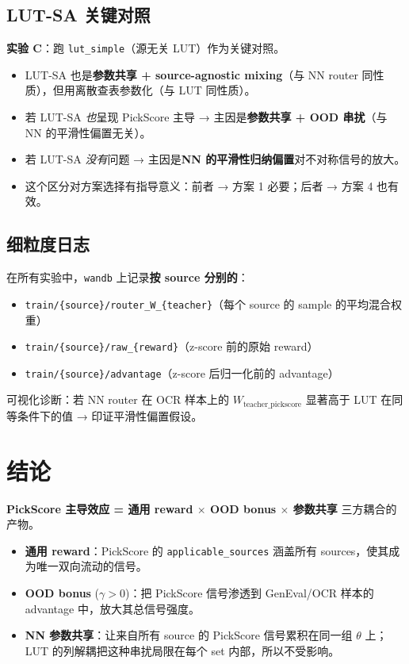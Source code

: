 \documentclass[11pt,a4paper]{article}
\begin{document}
\subsection{LUT-SA 关键对照}

\textbf{实验 C}：跑 \texttt{lut\_simple}（源无关 LUT）作为关键对照。
\begin{itemize}
    \item LUT-SA 也是\textbf{参数共享 + source-agnostic mixing}（与 NN router 同性质），但用离散查表参数化（与 LUT 同性质）。
    \item 若 LUT-SA \emph{也}呈现 PickScore 主导 → 主因是\textbf{参数共享 + OOD 串扰}（与 NN 的平滑性偏置无关）。
    \item 若 LUT-SA \emph{没有}问题 → 主因是\textbf{NN 的平滑性归纳偏置}对不对称信号的放大。
    \item 这个区分对方案选择有指导意义：前者 → 方案 1 必要；后者 → 方案 4 也有效。
\end{itemize}

\subsection{细粒度日志}

在所有实验中，\texttt{wandb} 上记录\textbf{按 source 分别的}：
\begin{itemize}
    \item \texttt{train/\{source\}/router\_W\_\{teacher\}}（每个 source 的 sample 的平均混合权重）
    \item \texttt{train/\{source\}/raw\_\{reward\}}（z-score 前的原始 reward）
    \item \texttt{train/\{source\}/advantage}（z-score 后归一化前的 advantage）
\end{itemize}

可视化诊断：若 NN router 在 OCR 样本上的 $W_{\text{teacher\_pickscore}}$ 显著高于 LUT 在同等条件下的值 → 印证平滑性偏置假设。

\section{结论}

\begin{tcolorbox}[colback=blue!5, colframe=blue!50, title=核心论断]
\textbf{PickScore 主导效应 = 通用 reward $\times$ OOD bonus $\times$ 参数共享} 三方耦合的产物。
\begin{itemize}
    \item \textbf{通用 reward}：PickScore 的 \texttt{applicable\_sources} 涵盖所有 sources，使其成为唯一双向流动的信号。
    \item \textbf{OOD bonus} ($\gamma > 0$)：把 PickScore 信号渗透到 GenEval/OCR 样本的 advantage 中，放大其总信号强度。
    \item \textbf{NN 参数共享}：让来自所有 source 的 PickScore 信号累积在同一组 $\theta$ 上；LUT 的列解耦把这种串扰局限在每个 set 内部，所以不受影响。
\end{itemize}
\end{tcolorbox}
\end{document}
